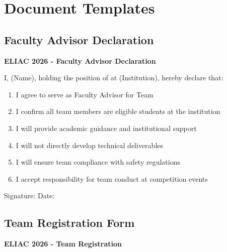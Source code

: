 
\section{Document Templates}

\subsection{Faculty Advisor Declaration}

\noindent\textbf{ELIAC 2026 - Faculty Advisor Declaration}

\vspace{1em}
\noindent I, \underline{\hspace{5cm}} (Name), holding the position of \underline{\hspace{5cm}} at \underline{\hspace{5cm}} (Institution), hereby declare that:

\begin{enumerate}[noitemsep]
    \item I agree to serve as Faculty Advisor for Team \underline{\hspace{5cm}}
    \item I confirm all team members are eligible students at the institution
    \item I will provide academic guidance and institutional support
    \item I will not directly develop technical deliverables
    \item I will ensure team compliance with safety regulations
    \item I accept responsibility for team conduct at competition events
\end{enumerate}

\vspace{2em}
\noindent Signature: \underline{\hspace{5cm}} Date: \underline{\hspace{3cm}}

\subsection{Team Registration Form}

\noindent\textbf{ELIAC 2026 - Team Registration}

